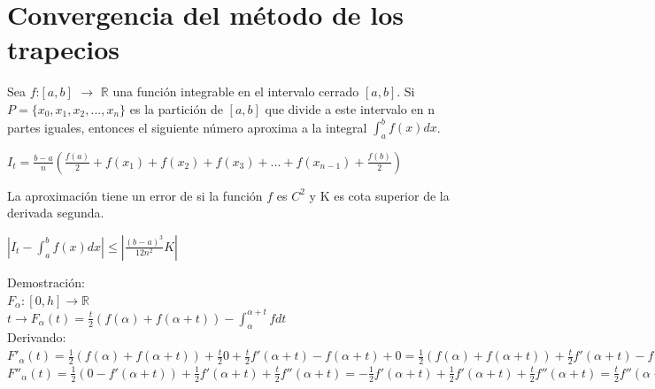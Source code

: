 \documentclass{beamer}
\begin{document}
\section{Convergencia del método de los trapecios}
\begin{frame}
\begin {theorem}
Sea $f$:$[a,b]$ $\rightarrow$ $\mathbb{R}$ una función integrable en el intervalo cerrado $[a,b]$. Si $P=\{x_0,x_1,x_2,...,x_n\}$ es la partición de $[a,b]$ que divide a este intervalo en n partes iguales, entonces el siguiente número aproxima a la integral $\int_a^bf(x)dx$.

$I_t= \frac{b-a}{n}\left( \frac{f(a)}{2} + f(x_1)+f(x_2)+f(x_3)+...+f(x_{n-1})+\frac{f(b)} {2} \right)$

La aproximación tiene un error de si la función $f$ es $C^2$ y K es cota superior de la derivada segunda.

$|I_t-\int_a^bf(x)dx|\leq |\frac {(b-a)^3} {12n^2} K|$
\end {theorem}
\end{frame}
\begin {frame}
Demostración:\\
$F_\alpha :[0,h]\rightarrow \mathbb{R}$\\
$t\rightarrow F_\alpha(t)=\frac{t}{2} \left(f(\alpha)+f(\alpha+t) \right)-\int_\alpha ^{\alpha+t} f dt$\\
Derivando:\\
$F'_\alpha(t)=\frac{1}{2}\left(f(\alpha)+f(\alpha+t) \right) +\frac{t}{2} 0 + \frac{t}{2} f'(\alpha+t)  -f(\alpha+t) +0=\frac{1}{2}\left(f(\alpha)+f(\alpha+t) \right)+ \frac{t}{2} f'(\alpha+t)  -f(\alpha+t)=\frac {1}{2} \left(f(\alpha)-f(\alpha+t) \right)+ \frac{t}{2} f'(\alpha+t)$\\

$F''_\alpha(t)=\frac {1}{2} \left(0-f'(\alpha+t) \right)+ \frac{1}{2} f'(\alpha+t)+\frac{t}{2}f''(\alpha+t)=-\frac {1}{2} f'(\alpha+t) + \frac{1}{2} f'(\alpha+t)+\frac{t}{2}f''(\alpha+t)=\frac{t}{2}f''(\alpha+t)$\\

\end{frame}
\end{document}
